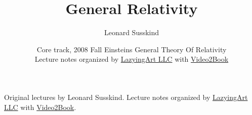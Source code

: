 \documentclass[11pt,oneside]{book}
\begin{document}
\frontmatter

\title{General Relativity}
\author{Leonard Susskind}
\date{Core track, 2008 Fall Einsteins General Theory Of Relativity \\ Lecture notes organized by \href{https://lazying.art}{LazyingArt LLC} with \href{https://github.com/lachlanchen/Video2Book}{Video2Book}}
\maketitle
\begin{center}
\small Original lectures by Leonard Susskind. Lecture notes organized by \href{https://lazying.art}{LazyingArt LLC} with \href{https://github.com/lachlanchen/Video2Book}{Video2Book}.
\end{center}
\clearpage
\tableofcontents
\mainmatter








\end{document}
